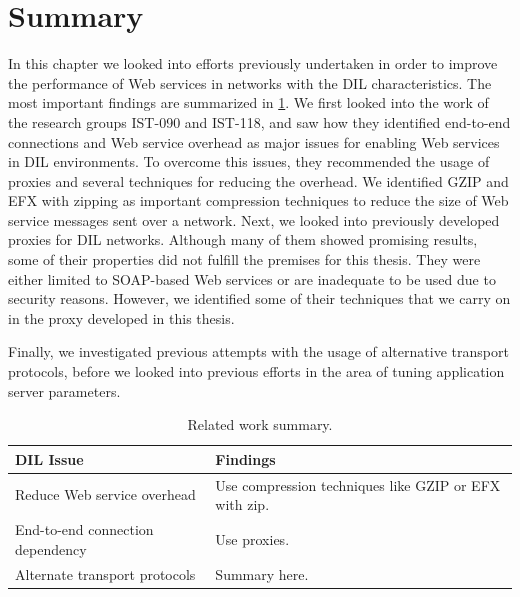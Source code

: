 \section{Summary}

In this chapter we looked into efforts previously undertaken in order to improve
the performance of Web services in networks with the DIL characteristics. The
most important findings are summarized in \cref{table:related-work-summary}. We
first looked into the work of the research groups IST-090 and IST-118, and saw
how they identified end-to-end connections and Web service overhead as major
issues for enabling Web services in DIL environments. To overcome this issues,
they recommended the usage of proxies and several techniques for reducing the
overhead. We identified GZIP and EFX with zipping as important compression
techniques to reduce the size of Web service messages sent over a network. Next,
we looked into previously developed proxies for DIL networks. Although many of
them showed promising results, some of their properties did not fulfill the
premises for this thesis. They were either limited to SOAP-based Web services or
are inadequate to be used due to security reasons. However, we identified some
of their techniques that we carry on in the proxy developed in this thesis.

Finally, we investigated previous attempts with the usage of alternative
transport protocols, before we looked into previous efforts in the area of
tuning application server parameters.

\begin{table}[h]
\begin{tabularx}{\textwidth}{| X | X |}
\hline
  \textbf{DIL Issue} & \textbf{Findings} \\ \hline

  Reduce Web service overhead  & Use compression techniques like GZIP or EFX
  with zip.\\ \hline

  End-to-end connection dependency & Use proxies. \\ \hline

  Alternate transport protocols & Summary here. \\ \hline
\end{tabularx}
\caption{Related work summary.}
\label{table:related-work-summary}
\end{table}
